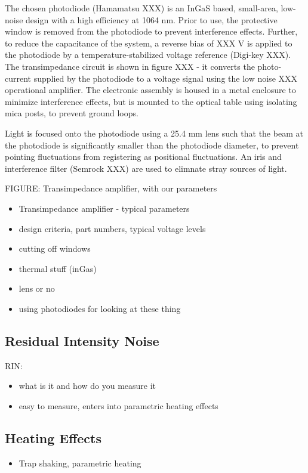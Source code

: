 \documentclass[twocolumn,aps,pra,showpacs,preprintnumbers,bibnotes]{revtex4-1}
\begin{document}
The chosen photodiode (Hamamatsu XXX) is an InGaS based, small-area, low-noise design with a high efficiency at 1064 nm.
Prior to use, the protective window is removed from the photodiode to prevent interference effects.
Further, to reduce the capacitance of the system, a reverse bias of XXX V is applied to the photodiode by a temperature-stabilized voltage reference (Digi-key XXX).
The transimpedance circuit is shown in figure XXX - it converts the photo-current supplied by the photodiode to a voltage signal using the low noise XXX operational amplifier. 
The electronic assembly is housed in a metal enclosure to minimize interference effects, but is mounted to the optical table using isolating mica posts, to prevent ground loops. 

Light is focused onto the photodiode using a 25.4 mm lens such that the beam at the photodiode is significantly smaller than the photodiode diameter, to prevent pointing fluctuations from registering as positional fluctuations. 
An iris and interference filter (Semrock XXX) are used to elimnate stray sources of light. 

FIGURE: Transimpedance amplifier, with our parameters
\begin{itemize}
	\item Transimpedance amplifier - typical parameters
	\item design criteria, part numbers, typical voltage levels
	\item cutting off windows
	\item thermal stuff (inGas)
	\item lens or no
	\item using photodiodes for looking at these thing
\end{itemize}

\subsection{Residual Intensity Noise}
RIN:
\begin{itemize}
\item what is it and how do you measure it
\item easy to measure, enters into parametric heating effects
\end{itemize}

\subsection{Heating Effects}
\begin{itemize}
	\item Trap shaking, parametric heating
\end{itemize}
\end{document}
